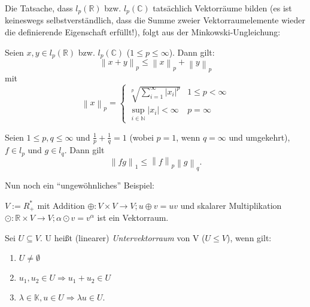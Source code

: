 \documentclass[10pt]{scrbook}
\begin{document}
\begin{Bem}
Die Tatsache, dass $l_p(\mathbb{R})$ bzw. $l_p(\mathbb{C})$ tatsächlich Vektorräume bilden (es ist keineswegs selbstverständlich, dass die Summe zweier Vektorraumelemente wieder die definierende Eigenschaft erfüllt!), folgt aus der Minkowski-Ungleichung:

Seien $x, y\in l_p(\mathbb{R})$ bzw. $l_p(\mathbb{C})$ ($1\leq p\leq \infty$). Dann gilt:
\begin{displaymath}
	\left\|x+y\right\|_p\leq \left\|x\right\|_p+\left\|y\right\|_p
\end{displaymath}
mit
\begin{displaymath}
	\left\|x\right\|_p=\begin{cases}
	\sqrt[p]{\sum\limits_{i=1}^\infty{\left|x_i\right|^p}} & 1\leq p<\infty \\
	\sup\limits_{i\in\mathbb{N}}{\left|x_i\right|}<\infty & p=\infty
	\end{cases}
\end{displaymath}
\end{Bem}

\begin{Sa}
Seien $1\leq p, q\leq \infty$ und $\frac{1}{p}+\frac{1}{q}=1$ (wobei $p=1$, wenn $q=\infty$ und umgekehrt), $f\in l_p$ und $g\in l_q$. Dann gilt
\begin{displaymath}
	\left\|f g\right\|_1\leq \left\|f\right\|_p \left\|g\right\|_q.
\end{displaymath}
\end{Sa}

Nun noch ein "`ungewöhnliches"' Beispiel:

\begin{Bsp}
$V:=R^*_+$ mit Addition $\oplus: V\times V\rightarrow V; u \oplus v = u v$ und skalarer Multiplikation $\odot: \mathbb{R}\times V\rightarrow V; \alpha \odot v=v^\alpha$ ist ein Vektorraum.
\end{Bsp}

\begin{Def}
Sei $U\subseteq V$. U heißt (linearer) \emph{Untervektorraum} von V ($U\leq V$), wenn gilt:
\begin{enumerate}
	\item $U\neq \emptyset$
	\item $u_1, u_2\in U\Rightarrow u_1+u_2\in U$
	\item $\lambda\in \mathbb{K}, u\in U\Rightarrow \lambda u\in U$.
\end{enumerate}
\end{Def}
\end{document}
